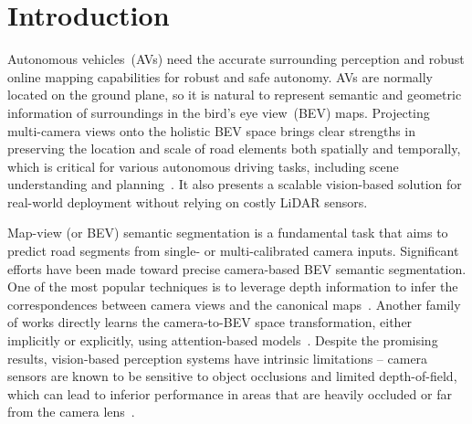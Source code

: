 \documentclass{article}
\begin{document}
\section{Introduction}
Autonomous vehicles~(AVs) need the accurate surrounding perception and robust online mapping capabilities for robust and safe autonomy.
%
AVs are normally located on the ground plane, so it is natural to represent semantic and geometric information of surroundings in the bird's eye view~(BEV) maps.
%
Projecting multi-camera views onto the holistic BEV space brings clear strengths in preserving the location and scale of road elements both spatially and temporally, which is critical for various autonomous driving tasks, including scene understanding and planning~\cite{ng2020bev, zhou2022cross}.
%
It also presents a scalable vision-based solution for real-world deployment without relying on costly LiDAR sensors.

Map-view (or BEV) semantic segmentation is a fundamental task that aims to predict road segments from single- or multi-calibrated camera inputs.
%
Significant efforts have been made toward precise camera-based BEV semantic segmentation.
%
One of the most popular techniques is to leverage depth information to infer the correspondences between camera views and the canonical maps~\cite{hu2021fiery, philion2020lift,ammar2019geometric,kim2019deep}.
%
Another family of works directly learns the camera-to-BEV space transformation, either implicitly or explicitly, using attention-based models~\cite{zhou2022cross,li2022bevformer,yang2021projecting, saha2021translating}.
Despite the promising results, vision-based perception systems have intrinsic limitations -- camera sensors are known to be sensitive to object occlusions and limited depth-of-field, which can lead to inferior performance in areas that are heavily occluded or far from the camera lens~\cite{zhou2022cross}.

\end{document}
